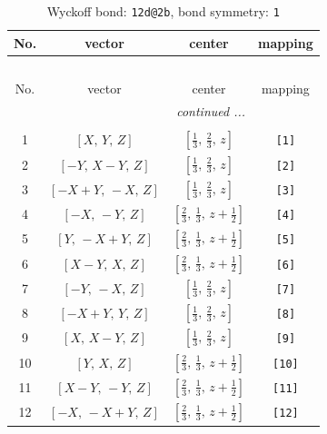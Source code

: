 \documentclass[fleqn,8pt]{jsarticle}
\begin{document}
\begin{longtable}{cccc}
\caption{Wyckoff bond: {\tt 12d@2b}, bond symmetry: {\tt 1}}
 \\
 \hline \hline
No. & vector & center & mapping \\ \hline \endfirsthead

\multicolumn{3}{l}{\tablename\ \thetable{}} \\
 \hline \hline
No. & vector & center & mapping \\ \hline \endhead

 \hline \hline
\multicolumn{3}{r}{\footnotesize\it continued ...} \\ \endfoot

 \hline \hline
\multicolumn{3}{r}{} \\ \endlastfoot

1 & $\left[ X,\, Y,\, Z \right]$ & $\left[ \frac{1}{3},\, \frac{2}{3},\, z \right]$ & {\tt [1]} \\ \hline
2 & $\left[ - Y,\, X - Y,\, Z \right]$ & $\left[ \frac{1}{3},\, \frac{2}{3},\, z \right]$ & {\tt [2]} \\ \hline
3 & $\left[ - X + Y,\, - X,\, Z \right]$ & $\left[ \frac{1}{3},\, \frac{2}{3},\, z \right]$ & {\tt [3]} \\ \hline
4 & $\left[ - X,\, - Y,\, Z \right]$ & $\left[ \frac{2}{3},\, \frac{1}{3},\, z + \frac{1}{2} \right]$ & {\tt [4]} \\ \hline
5 & $\left[ Y,\, - X + Y,\, Z \right]$ & $\left[ \frac{2}{3},\, \frac{1}{3},\, z + \frac{1}{2} \right]$ & {\tt [5]} \\ \hline
6 & $\left[ X - Y,\, X,\, Z \right]$ & $\left[ \frac{2}{3},\, \frac{1}{3},\, z + \frac{1}{2} \right]$ & {\tt [6]} \\ \hline
7 & $\left[ - Y,\, - X,\, Z \right]$ & $\left[ \frac{1}{3},\, \frac{2}{3},\, z \right]$ & {\tt [7]} \\ \hline
8 & $\left[ - X + Y,\, Y,\, Z \right]$ & $\left[ \frac{1}{3},\, \frac{2}{3},\, z \right]$ & {\tt [8]} \\ \hline
9 & $\left[ X,\, X - Y,\, Z \right]$ & $\left[ \frac{1}{3},\, \frac{2}{3},\, z \right]$ & {\tt [9]} \\ \hline
10 & $\left[ Y,\, X,\, Z \right]$ & $\left[ \frac{2}{3},\, \frac{1}{3},\, z + \frac{1}{2} \right]$ & {\tt [10]} \\ \hline
11 & $\left[ X - Y,\, - Y,\, Z \right]$ & $\left[ \frac{2}{3},\, \frac{1}{3},\, z + \frac{1}{2} \right]$ & {\tt [11]} \\ \hline
12 & $\left[ - X,\, - X + Y,\, Z \right]$ & $\left[ \frac{2}{3},\, \frac{1}{3},\, z + \frac{1}{2} \right]$ & {\tt [12]} \\
\end{longtable}
\end{document}
